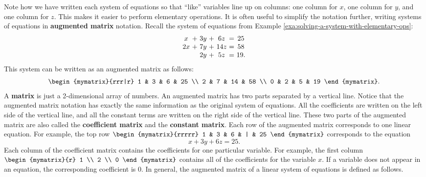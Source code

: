 Note how we have written each system of equations so that ``like''
variables line up on columns: one column for $x$, one column for $y$,
and one column for $z$. This makes it easier to perform elementary
operations. It is often useful to simplify the notation further,
writing systems of equations in \textbf{augmented matrix} notation. Recall the
system of equations from Example \ref{exa:solving-a-system-with-elementary-ops}:
\begin{equation*}
\begin{array}{c@{~}c@{~}c@{~}c@{~}c@{~}c@{~}c}
x&+&3y&+&6z&=&25 \\
2x&+&7y&+&14z&=&58 \\
&&2y&+&5z&=&19.
\end{array}
\end{equation*}
This system can be written as an augmented matrix as follows:
\begin{equation*}
\begin{mymatrix}{rrr|r}
1 & 3 & 6 & 25 \\
2 & 7 & 14 & 58 \\
0 & 2 & 5 & 19
\end{mymatrix}.
\end{equation*}
A \textbf{matrix} is just a 2-dimensional array of
numbers. An augmented matrix has two parts separated by a vertical
line. Notice that the augmented matrix notation has exactly the same
information as the original system of equations. All the coefficients
are written on the left side of the vertical line, and all the
constant terms are written on the right side of the vertical
line. These two parts of the augmented matrix are also called the
\textbf{coefficient matrix} and the \textbf{constant
  matrix}.  Each
row of the augmented matrix corresponds to one linear equation. For example,
the top row $\begin{mymatrix}{rrrrr}
1 & 3 & 6 & | & 25
\end{mymatrix}$
 corresponds to the equation
\begin{equation*}
x+3y+6z=25.
\end{equation*}
Each column of the coefficient matrix contains the coefficients
for one particular variable. For example, the first column $\begin{mymatrix}{r}
1 \\
2 \\
0
\end{mymatrix}$ contains all of the coefficients for the variable $x$. If a
variable does not appear in an equation, the corresponding coefficient
is $0$. In general, the augmented matrix of a linear system of
equations is defined as follows.

